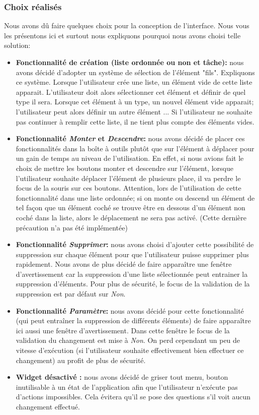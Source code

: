 \documentclass[a4paper,10pt]{article}
\begin{document}
\subsubsection{Choix réalisés}
Nous avons dû faire quelques choix pour la conception de l'interface. Nous vous les présentons ici et surtout nous expliquons pourquoi nous avons choisi telle solution:
\begin{itemize}
\item \textbf{Fonctionnalité de création (liste ordonnée ou non et tâche):} nous avons décidé d'adopter un système de sélection de l'élément "fils". Expliquons ce système. Lorsque l'utilisateur crée une liste, un élément vide de cette liste apparait. L'utilisateur doit alors sélectionner cet élément et définir de quel type il sera. Lorsque cet élément à un type, un nouvel élément vide apparait; l'utilisateur peut alors définir un autre élément ... Si l'utilisateur ne souhaite pas continuer à remplir cette liste, il ne tient plus compte des éléments vides.
\item \textbf{Fonctionnalité \textit{Monter} et \textit{Descendre}:} nous avons décidé de placer ces fonctionnalités dans la boîte à outils plutôt que sur l'élément à déplacer pour un gain de temps au niveau de l'utilisation. En effet, si nous avions fait le choix de mettre les boutons monter et descendre sur l'élément, lorsque l'utilisateur souhaite déplacer l'élément de plusieurs place, il va perdre le focus de la souris sur ces boutons. Attention, lors de l'utilisation de cette fonctionnalité dans une liste ordonnée; si on monte ou descend un élément de tel façon que un élément coché se trouve être en dessous d'un élément non coché dans la liste, alors le déplacement ne sera pas activé. (Cette dernière précaution n'a pas été implémentée)
\item \textbf{Fonctionnalité \textit{Supprimer}:} nous avons choisi d'ajouter cette possibilité de suppression sur chaque élément pour que l'utilisateur puisse supprimer plus rapidement. Nous avons de plus décidé de faire apparaître une fenêtre d'avertissement car la suppression d'une liste sélectionnée peut entrainer la suppression d'éléments. Pour plus de sécurité, le focus de la validation de la suppression est par défaut sur \textit{Non}.
\item \textbf{Fonctionnalité \textit{Paramètre}:} nous avons décidé pour cette fonctionnalité (qui peut entraîner la suppression de différents éléments) de faire apparaître ici aussi une fenêtre d'avertissement. Dans cette fenêtre le focus de la validation du changement est mise à \textit{Non}. On perd cependant un peu de vitesse d'exécution (si l'utilisateur souhaite effectivement bien effectuer ce changement) au profit de plus de sécurité.
\item \textbf{Widget désactivé :} nous avons décidé de griser tout menu, bouton inutilisable à un état de l'application afin que l'utilisateur n'exécute pas d'actions impossibles. Cela évitera qu'il se pose des questions s'il voit aucun changement effectué.
\end{itemize}
\end{document}
